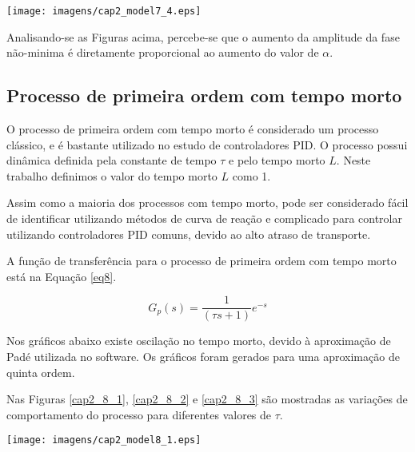     \begin{center}
        \texttt{[image: imagens/cap2\_model7\_4.eps]}
        \label{cap2_14}
    \end{center}

    Analisando-se as Figuras acima, percebe-se que o aumento da amplitude da fase não-minima é
    diretamente proporcional ao aumento do valor de $\alpha$.

\subsection{Processo de primeira ordem com tempo morto}

    O processo de primeira ordem com tempo morto é considerado um processo
    clássico, e é bastante utilizado no estudo de controladores \acs{PID}. O
    processo possui dinâmica definida pela constante de tempo $\tau$ e pelo
    tempo morto $L$. Neste trabalho definimos o valor do tempo morto $L$ como 1.
    
    Assim como a maioria dos processos com tempo morto, pode ser considerado
    fácil de identificar utilizando métodos de curva de reação e complicado para
    controlar utilizando controladores \acs{PID} comuns, devido ao alto atraso
    de transporte.

    A função de transferência para o processo de primeira ordem com tempo morto 
    está na Equação \ref{eq8}.

    \begin{equation}
        \label{eq8}
        G_p(s) = \frac{1}{(\tau s +1)}e^{-s}
    \end{equation}
    
    Nos gráficos abaixo existe oscilação no tempo morto, devido à aproximação de
    Padé utilizada no software. Os gráficos foram gerados para uma aproximação
    de quinta ordem.

    Nas Figuras \ref{cap2_8_1}, \ref{cap2_8_2} e \ref{cap2_8_3} são mostradas as
    variações de comportamento do processo para diferentes valores de $\tau$.

    \begin{center}
        \texttt{[image: imagens/cap2\_model8\_1.eps]}
	\label{cap2_8_1}
    \end{center}

